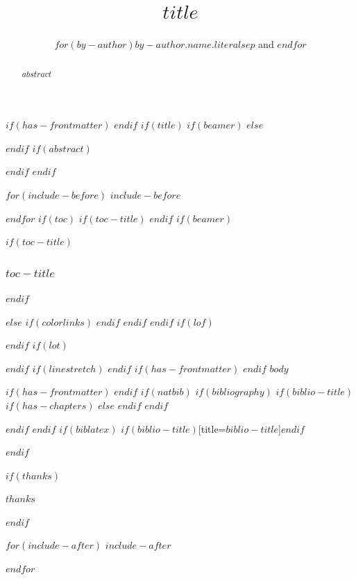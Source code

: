 \documentclass[ $if(fontsize)$$fontsize$, $endif$ $if(papersize)$$papersize$paper, $endif$ $for(classoption)$$classoption$$sep$, $endfor$ ]{sagej}
\title{$title$}
\author{$for(by-author)$$by-author.name.literal$\affilnum{$it.number$}$sep$ and $endfor$}
\affiliation{
  $for(by-affiliation)$
  \affilnum{$it.number$} $it.name$$if(it.department)$, $it.department$$endif$ \\
  $endfor$
}
\begin{document}
\maketitle


$if(has-frontmatter)$
\frontmatter
$endif$
$if(title)$
$if(beamer)$
\frame{\titlepage}
$else$
\maketitle
$endif$
$if(abstract)$
\begin{abstract}
$abstract$
\end{abstract}
$endif$
$endif$

$for(include-before)$
$include-before$

$endfor$
$if(toc)$
$if(toc-title)$
\renewcommand*\contentsname{$toc-title$}
$endif$
$if(beamer)$
\begin{frame}[allowframebreaks]
$if(toc-title)$
  \frametitle{$toc-title$}
$endif$
  \tableofcontents[hideallsubsections]
\end{frame}
$else$
{
$if(colorlinks)$
\hypersetup{linkcolor=$if(toccolor)$$toccolor$$else$$endif$}
$endif$
\setcounter{tocdepth}{$toc-depth$}
\tableofcontents
}
$endif$
$endif$
$if(lof)$
\listoffigures
$endif$
$if(lot)$
\listoftables
$endif$
$if(linestretch)$
$endif$
$if(has-frontmatter)$
\mainmatter
$endif$
$body$

$if(has-frontmatter)$
\backmatter
$endif$
$if(natbib)$
$if(bibliography)$
$if(biblio-title)$
$if(has-chapters)$
\renewcommand\bibname{$biblio-title$}
$else$
\renewcommand\refname{$biblio-title$}
$endif$
$endif$


$endif$
$endif$
$if(biblatex)$
\printbibliography$if(biblio-title)$[title=$biblio-title$]$endif$

$endif$

$if(thanks)$
\begin{acks}
  $thanks$
\end{acks}
$endif$

$for(include-after)$
$include-after$

$endfor$
\end{document}
